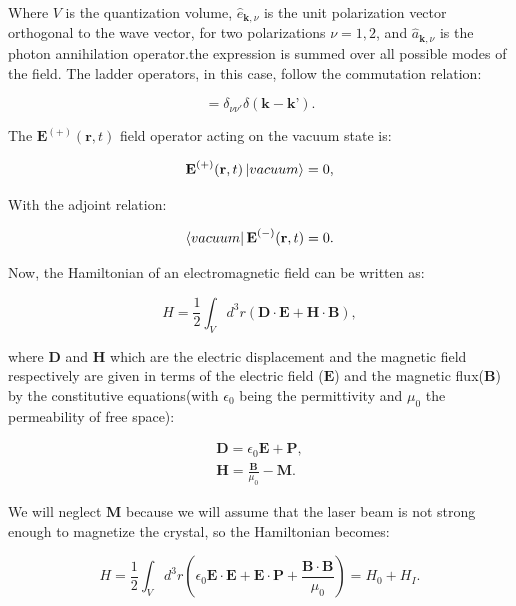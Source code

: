 \documentclass[12pt]{article}
\begin{document}
Where $V$ is the quantization volume, $\hat{e}_{\mathbf{k},\nu}$ is the unit polarization vector orthogonal to the wave vector, for two polarizations $\nu=1,2$, and $\hat{a}_{\textbf{k},\nu}$ is the  photon annihilation operator.the expression is summed over all possible modes of the field. The ladder operators, in this case, follow the commutation relation:

\begin{equation}
[\hat{a}_{\textbf{k},\nu},\hat{a^{\dagger}}_{\textbf{k},\nu}]=\delta_{\nu \nu'}\delta(\textbf{k}-\textbf{k'}).
\end{equation} 

The $\textbf{E}^{(+)} (\textbf{r},t)$ field operator acting on the vacuum state is:

\begin{equation}
\textbf{E}^{(+)} (\textbf{r},t)\ket{vacuum}=0,
\end{equation}

With the adjoint relation:

\begin{equation}
\bra{vacuum}\textbf{E}^{(-)} (\textbf{r},t)=0.
\end{equation}

Now, the Hamiltonian of an electromagnetic field can be written as:

\begin{equation}
H=\frac{1}{2}\int_{V} d^{3}r (\mathbf{D \cdot E}+\mathbf{H \cdot B}),
\end{equation}

where $\textbf{D}$ and $\textbf{H}$ which are the electric displacement and the magnetic field respectively are given in terms of the electric field ($\textbf{E}$) and the magnetic flux($\textbf{B}$) by the constitutive equations(with $\epsilon_{0} $ being the permittivity and $\mu_{0}$ the permeability of free space):


\begin{align}
\textbf{D}= \epsilon_{0} \textbf{E}+\textbf{P},\\
\textbf{H}=\frac{\textbf{B}}{\mu_{0}}-\textbf{M}.
\end{align}

We will neglect $\textbf{M}$ because we will assume that the laser beam is not strong enough to magnetize the crystal, so the Hamiltonian becomes:

\begin{equation}
H=\frac{1}{2}\int_{V} d^{3}r \left(\epsilon_{0}\mathbf{E \cdot E}+\mathbf{E \cdot P}+\frac{\mathbf{B \cdot B}}{\mu_{0}} \right)=H_{0}+H_{I}.
\end{equation}
\end{document}
